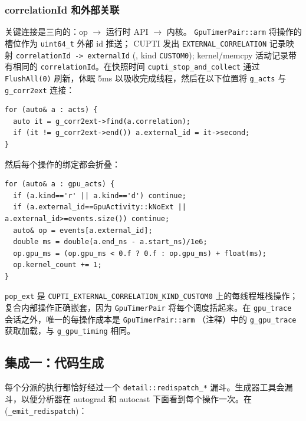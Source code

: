 \subsubsection{correlationId 和外部关联}

关键连接是三向的：op $\rightarrow$ 运行时 API $\rightarrow$ 内核。 \texttt{GpuTimerPair::arm} 将操作的槽位作为 \texttt{uint64\_t} 外部 id 推送； CUPTI 发出 \texttt{EXTERNAL\_CORRELATION} 记录映射 \texttt{correlationId -> externalId} (, kind \texttt{CUSTOM0}); kernel/memcpy 活动记录带有相同的 \texttt{correlationId}。在快照时间 \texttt{cupti\_stop\_and\_collect} 通过 \texttt{FlushAll(0)} 刷新，休眠 5ms 以吸收完成线程，然后在以下位置将 \texttt{g\_acts} 与 \texttt{g\_corr2ext} 连接：

\begin{lstlisting}[caption={external-id join.}, label=lst:correlationJoin, style=cppstyle]
for (auto& a : acts) {
  auto it = g_corr2ext->find(a.correlation);
  if (it != g_corr2ext->end()) a.external_id = it->second;
}
\end{lstlisting}

然后每个操作的绑定都会折叠：

\begin{lstlisting}[caption={per-op kernel aggregation.}, label=lst:foldKernels, style=cppstyle]
for (auto& a : gpu_acts) {
  if (a.kind=='r' || a.kind=='d') continue;
  if (a.external_id==GpuActivity::kNoExt || a.external_id>=events.size()) continue;
  auto& op = events[a.external_id];
  double ms = double(a.end_ns - a.start_ns)/1e6;
  op.gpu_ms = (op.gpu_ms < 0.f ? 0.f : op.gpu_ms) + float(ms);
  op.kernel_count += 1;
}
\end{lstlisting}

\texttt{pop\_ext} 是 \texttt{CUPTI\_EXTERNAL\_CORRELATION\_KIND\_CUSTOM0} 上的每线程堆栈操作；复合内部操作正确嵌套，因为 \texttt{GpuTimerPair} 将每个调度括起来。在 \texttt{gpu\_trace} 会话之外，唯一的每操作成本是 \texttt{GpuTimerPair::arm} （注释）中的 \texttt{g\_gpu\_trace} 获取加载，与 \texttt{g\_gpu\_timing} 相同。

\subsection{集成一：代码生成}

每个分派的执行都恰好经过一个 \texttt{detail::redispatch\_*} 漏斗。生成器工具会漏斗，以便分析器在 autograd 和 autocast 下面看到每个操作一次。在 (\texttt{\_emit\_redispatch})：

